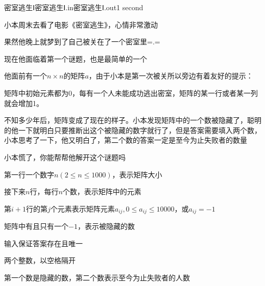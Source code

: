 \begin{problem}{密室逃生Ⅰ}{密室逃生Ⅰ.in}{密室逃生Ⅰ.out}{1 second}

小本周末去看了电影《密室逃生》，心情非常激动

果然他晚上就梦到了自己被关在了一个密室里=.=

现在他面临着第一个谜题，也是最简单的一个

他面前有一个$n\times n$的矩阵$a$，由于小本是第一次被关所以旁边有着友好的提示：

矩阵中初始元素都为0，每有一个人未能成功逃出密室，矩阵的某一行或者某一列就会增加1。

不知多少年后，矩阵变成了现在的样子。小本发现矩阵中的一个数被隐藏了，聪明的他一下就明白只要推断出这个被隐藏的数字就行了，但是答案需要填入两个数，小本思考了一下，他又明白了，第二个数的答案一定是至今为止失败者的数量

小本慌了，你能帮帮他解开这个谜题吗

\InputFile

第一行一个数字$n(2\le n\le 1000)$，表示矩阵大小

接下来$n$行，每行$n$个数，表示矩阵中的元素

第$i+1$行的第$j$个元素表示矩阵元素$a_{ij},0\le a_{ij}\le 10000$，或$a_{ij}=-1$

矩阵中有且只有一个$-1$，表示被隐藏的数

输入保证答案存在且唯一

\OutputFile

两个整数，以空格隔开

第一个数是隐藏的数，第二个数表示至今为止失败者的人数

\Examples

\begin{example}
%
\end{example}
\end{problem}

